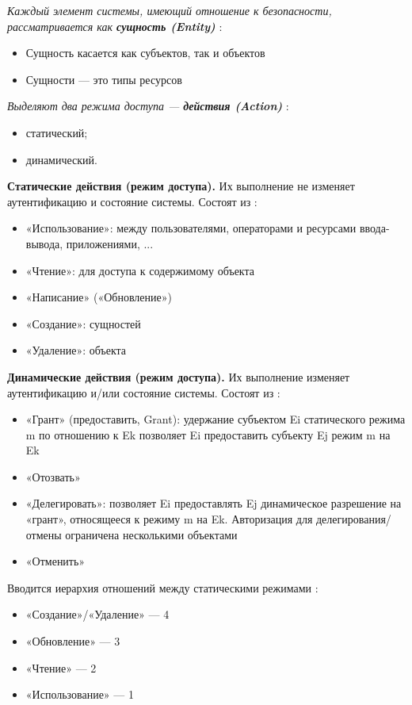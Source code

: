 \textit{Каждый элемент системы, имеющий отношение к безопасности, рассматривается как \textbf{сущность (Entity)}} \autocite{Jalili}:
\begin{itemize}
    \item Сущность касается как субъектов, так и объектов
    \item Сущности --- это типы ресурсов
\end{itemize}

\textit{Выделяют два режима доступа --- \textbf{действия (Action)}} \autocite{Jalili}:
\begin{itemize}
    \item статический;
    \item динамический.
\end{itemize}

\textbf{Статические действия (режим доступа).} Их выполнение не изменяет аутентификацию и состояние системы.
Состоят из \autocite{SecModels}:
\begin{itemize}
    \item «Использование»: между пользователями, операторами и ресурсами ввода-вывода, приложениями, ...
    \item «Чтение»: для доступа к содержимому объекта
    \item «Написание» («Обновление»)
    \item «Создание»: сущностей
    \item «Удаление»: объекта
\end{itemize}

\textbf{Динамические действия (режим доступа).} Их выполнение изменяет аутентификацию и/или состояние системы.
Состоят из \autocite{SecModels}:
\begin{itemize}
    \item «Грант» (предоставить, Grant): удержание субъектом Ei статического режима m по отношению к Ek
    позволяет Ei предоставить субъекту Ej режим m на Ek
    \item «Отозвать»
    \item «Делегировать»: позволяет Ei предоставлять Ej динамическое разрешение на «грант», относящееся к режиму m
    на Ek. Авторизация для делегирования/отмены ограничена несколькими объектами
    \item «Отменить»
\end{itemize}

Вводится иерархия отношений между статическими режимами \autocite{Jalili}:
\begin{itemize}
    \item «Создание»/«Удаление» --- 4
    \item «Обновление» --- 3
    \item «Чтение» --- 2
    \item «Использование» --- 1
\end{itemize}


